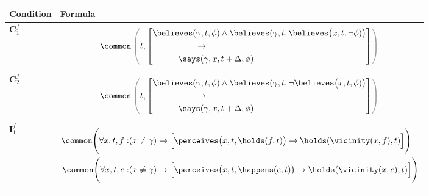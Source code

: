 \begin{table}
\begin{small}
\begin{center}
  \begin{tabular}{lp{12cm}}
\toprule
\textbf{Condition} & \textbf{Formula}  \\
\midrule
$\mathbf{C}^f_1$ &          \begin{equation*}
          \common\color{gray!80}\left(\color{black}t, \left[\begin{aligned}
                &  \believes(\gamma, t, \phi) \land \believes(\gamma, t,
                \believes\big(x, t, \lnot \phi)\big)
                \\ & \hspace{50pt} \rightarrow \\
                & \hspace{30pt}\says(\gamma, x, t + \Delta, \phi)
              \end{aligned}\right]\color{gray!80}\right)\color{black}
        \end{equation*}
\\
\midrule

$\mathbf{C}^f_2$ &     \begin{equation*}
          \common\color{gray!80}\left(\color{black}t,\left[ \begin{aligned}
                &  \believes(\gamma, t, \phi) \land \believes(\gamma, t,
                \lnot \believes\big(x, t, \phi)\big)
                \\ &  \hspace{50pt}  \rightarrow \\
                & \hspace{30pt}\says(\gamma, x, t + \Delta, \phi)
              \end{aligned}\right]\color{gray!80}\right)\color{black}
        \end{equation*} \\
\midrule

$\mathbf{I}^f_1$ &
 \begin{equation*} \begin{aligned}
            \common\Bigg(\forall x, t, f:& (x \not = \gamma) \rightarrow \Big[\perceives\big(x, t, \holds(f, t)\big) \rightarrow
            \holds(\vicinity(x, f), t)\Big]\Bigg)\\
            \common\Bigg(\forall x, t, e:& (x \not = \gamma) \rightarrow \Big[\perceives\big(x, t, \happens(e, t)\big) \rightarrow
            \holds(\vicinity(x, e), t)\Big]\Bigg)\\
          \end{aligned}\end{equation*}
\\
\midrule


\end{tabular}
\end{center}
\end{small}
\end{table}
